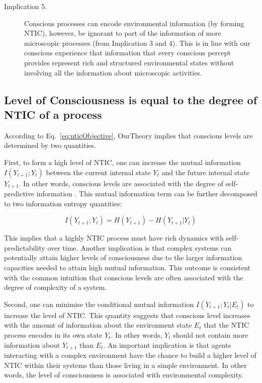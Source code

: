 \documentclass[utf8]{article}
\begin{document}
\begin{description}
            \item[Implication 5.]
            Conscious processes can encode environmental information (by forming NTIC), however, be ignorant to part of the information of more microscopic processes (from Implication 3 and 4). This is in line with our conscious experience that information that every conscious percept provides represent rich and structured environmental states without involving all the information about microscopic activities.
        \end{description}
		
		
	    \subsection{Level of Consciousness is equal to the degree of NTIC of a process}\label{sec:cl}
            According to Eq.~\ref{eq:nticObjective}, \ac{OurTheory} implies that conscious levels are determined by two quantities. 
            
            First, to form a high level of NTIC, one can increase the mutual information $I(Y_{t+1};Y_{t})$ between the current internal state $Y_t$ and the future internal state $Y_{t+1}$. In other words, conscious levels are associated with the degree of self-predictive information \citep{bialek2001predictability}. This mutual information term can be further decomposed to two information entropy quantities: 
            
            \begin{equation}
            \label{eq:SelfEntropy}
            I(Y_{t+1};Y_{t}) = H(Y_{t+1}) - H(Y_{t+1}|Y_t)
            \end{equation}
            
            This implies that a highly NTIC process must have rich dynamics with self-predictability over time. Another implication is that complex systems can potentially attain higher levels of consciousness due to the larger information capacities needed to attain high mutual information. This outcome is consistent with the common intuition that conscious levels are often associated with the degree of complexity of a system.
    
    	    Second, one can minimise the conditional mutual information $I(Y_{t+1};Y_{t}|E_{t})$ to increase the level of NTIC. This quantity suggests that conscious level increases with the amount of information about the environment state $E_t$ that the NTIC process encodes in its own state $Y_t$. In other words, $Y_t$ should not contain more information about $Y_{t+1}$ than $E_t$. An important implication is that agents interacting with a complex environment have the chance to build a higher level of NTIC within their systems than those living in a simple environment. In other words, the level of consciousness is associated with environmental complexity. 
    	   
\end{document}
